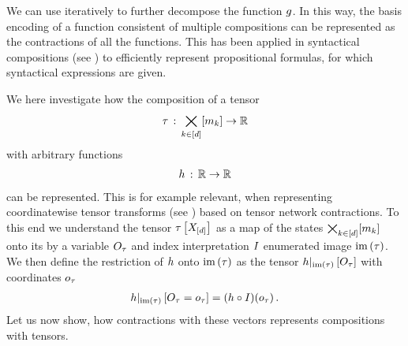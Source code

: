 We can use  iteratively to further decompose the function $g$.
In this way, the basis encoding of a function consistent of multiple compositions can be represented as the contractions of all the functions.
This has been applied in syntactical compositions (see ) to efficiently represent propositional formulas, for which syntactical expressions are given.


We here investigate how the composition of a tensor
\begin{align*}
    \tau \,:\, \bigtimes_{k\in[d]}[m_{k}] \rightarrow \mathbb{R}
\end{align*}
with arbitrary functions
\begin{align*}
    h \,:\, \mathbb{R} \rightarrow \mathbb{R}
\end{align*}
can be represented.
This is for example relevant, when representing coordinatewise tensor transforms (see ) based on tensor network contractions.
To this end we understand the tensor $\tau\left[X_{[d]}\right]$ as a map of the states $\bigtimes_{k\in[d]}[m_{k}]$ onto its by a variable $O_{\tau}$ and index interpretation $I$ enumerated image $\mathrm{im}\left(\tau\right)$.
We then define the restriction of $h$ onto $\mathrm{im}\left(\tau\right)$ as the tensor ${h}|_{\mathrm{im}\left(\tau\right)}\left[O_{\tau}\right]$ with coordinates $o_{\tau}$
\begin{align*}
    {h}|_{\mathrm{im}\left(\tau\right)}\left[O_{\tau}=o_{\tau}\right]
    = ({h}\circ{I})(o_{\tau}) \, .
\end{align*}
Let us now show, how contractions with these vectors represents compositions with tensors.

